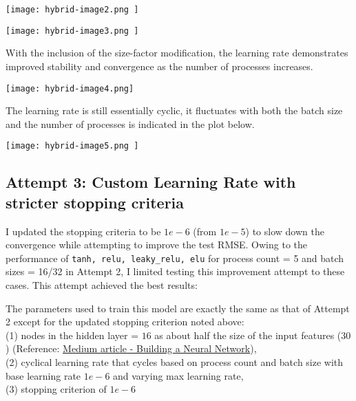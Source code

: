 \documentclass{article}
\begin{document}
\begin{center}
\texttt{[image: hybrid-image2.png ]}
\end{center}

\begin{center}
\texttt{[image: hybrid-image3.png ]}
\end{center}

With the inclusion of the size-factor modification, the learning rate demonstrates improved stability and convergence as the number of processes increases.

\begin{center}
\texttt{[image: hybrid-image4.png]}
\end{center}

The learning rate is still essentially cyclic, it fluctuates with both the batch size and the number of processes is indicated in the plot below.

\begin{center}
\texttt{[image: hybrid-image5.png ]}
\end{center}

\subsection{Attempt 3: Custom Learning Rate with stricter stopping criteria}

I updated the stopping criteria to be $1e-6$ (from $1e-5$) to slow down the convergence while attempting to improve the test RMSE. Owing to the performance of \verb|tanh, relu, leaky_relu, elu| for process count = 5 and batch sizes = 16/32 in Attempt 2, I limited testing this improvement attempt to these cases. This attempt achieved the best results:

The parameters used to train this model are exactly the same as that of Attempt 2 except for the updated stopping criterion noted above: \\
(1) nodes in the hidden layer = $16$ as about half the size of the input features ($30$) (Reference: \href{https://medium.com/data-science/17-rules-of-thumb-for-building-a-neural-network-93356f9930af}{Medium article - Building a Neural Network}), \\
(2) cyclical learning rate that cycles based on process count and batch size with base learning rate $1e-6$ and varying max learning rate, \\
(3) stopping criterion of $1e-6$ \\
\end{document}
